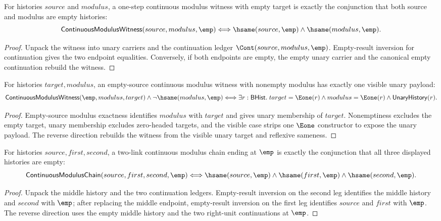 \begin{theorem}
\label{thm:continuous-modulus-witness-empty-target-iff}
For histories $source$ and $modulus$, a one-step continuous modulus witness
with empty target is exactly the conjunction that both source and modulus are
empty histories:
$$
\mathsf{ContinuousModulusWitness}(source,modulus,\emp)
\Longleftrightarrow
\hsame(source,\emp)\land\hsame(modulus,\emp).
$$
\end{theorem}
\begin{proof}
Unpack the witness into unary carriers and the continuation ledger
$\Cont(source,modulus,\emp)$. Empty-result inversion for continuation gives
the two endpoint equalities. Conversely, if both endpoints are empty, the
empty unary carrier and the canonical empty continuation rebuild the witness.
\end{proof}

\begin{theorem}
\label{thm:continuous-empty-source-nonempty-modulus-shape}
For histories $target,modulus$, an empty-source continuous modulus witness with
nonempty modulus has exactly one visible unary payload:
$$
\mathsf{ContinuousModulusWitness}(\emp,modulus,target)\wedge
\neg\hsame(modulus,\emp)
\Longleftrightarrow
\exists r:\mathsf{BHist}.\;
target=\Eone(r)\wedge modulus=\Eone(r)\wedge\mathsf{UnaryHistory}(r).
$$
\end{theorem}
\begin{proof}
Empty-source modulus exactness identifies $modulus$ with $target$ and gives
unary membership of $target$. Nonemptiness excludes the empty target, unary
membership excludes zero-headed targets, and the visible case strips one
$\Eone$ constructor to expose the unary payload. The reverse direction
rebuilds the witness from the visible unary target and reflexive sameness.
\end{proof}

\begin{theorem}
\label{thm:continuous-modulus-chain-empty-target-iff}
For histories $source,first,second$, a two-link continuous modulus chain ending
at $\emp$ is exactly the conjunction that all three displayed histories are
empty:
$$
\mathsf{ContinuousModulusChain}(source,first,second,\emp)
\Longleftrightarrow
\hsame(source,\emp)\land\hsame(first,\emp)\land\hsame(second,\emp).
$$
\end{theorem}
\begin{proof}
Unpack the middle history and the two continuation ledgers. Empty-result
inversion on the second leg identifies the middle history and $second$ with
$\emp$; after replacing the middle endpoint, empty-result inversion on the
first leg identifies $source$ and $first$ with $\emp$. The reverse direction
uses the empty middle history and the two right-unit continuations at
$\emp$.
\end{proof}

